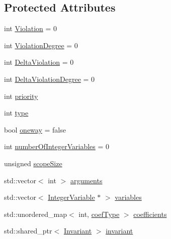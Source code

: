 \subsection*{Protected Attributes}
\begin{DoxyCompactItemize}
\item 
int \hyperlink{class_constraint_ab80bb8ec253665f6572a94877579cdfb}{Violation} = 0
\item 
int \hyperlink{class_constraint_a673b620b0be43337a301c407afc15133}{Violation\-Degree} = 0
\item 
int \hyperlink{class_constraint_a8bddcdcac31ae446e91fd57a78841c75}{Delta\-Violation} = 0
\item 
int \hyperlink{class_constraint_a62ef0cdd114d9f44dbf4d07f9aa254f5}{Delta\-Violation\-Degree} = 0
\item 
int \hyperlink{class_constraint_a72868dc8e9187cc8eb8b43560890b895}{priority}
\item 
int \hyperlink{class_constraint_a377cd0c46beac0ad81d131b92824b626}{type}
\item 
bool \hyperlink{class_constraint_a9cc8e2f30e52abe6eb19311269f628ce}{oneway} = false
\item 
int \hyperlink{class_constraint_a010acf737425b29cb7a8f9263ecb02eb}{number\-Of\-Integer\-Variables} = 0
\item 
unsigned \hyperlink{class_constraint_afe1a5dbe5eb0c511d437d17c70960416}{scope\-Size}
\item 
std\-::vector$<$ int $>$ \hyperlink{class_constraint_a070f51ff894d874d90f550bbec989fe7}{arguments}
\item 
std\-::vector$<$ \hyperlink{class_integer_variable}{Integer\-Variable} $\ast$ $>$ \hyperlink{class_constraint_abd73767b8640c514f582a9316a1ce792}{variables}
\item 
std\-::unordered\-\_\-map$<$ int, \hyperlink{_constants_8hpp_a08c47c54ab9fb1545c341ec853cc2278}{coef\-Type} $>$ \hyperlink{class_constraint_a976da5d8a1e74efb119f47094b721df9}{coefficients}
\item 
std\-::shared\-\_\-ptr$<$ \hyperlink{class_invariant}{Invariant} $>$ \hyperlink{class_constraint_ad1aa16aebdbfff66d761850f0e70e5c8}{invariant}
\end{DoxyCompactItemize}


